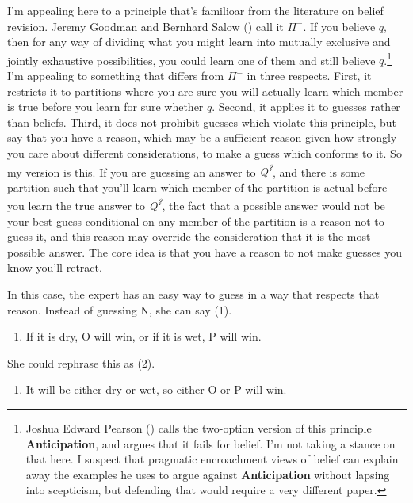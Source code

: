 \documentclass[
  11pt,
  letterpaper,
  DIV=11,
  numbers=noendperiod,
  twoside]{scrartcl}
\providecommand{\tightlist}{%
  \setlength{\itemsep}{0pt}\setlength{\parskip}{0pt}}
\begin{document}
I'm appealing here to a principle that's familioar from the literature
on belief revision. Jeremy Goodman and Bernhard Salow
() call it \(\Pi^-\). If you
believe \(q\), then for any way of dividing what you might learn into
mutually exclusive and jointly exhaustive possibilities, you could learn
one of them and still believe \(q\).\footnote{Joshua Edward Pearson
  () calls the two-option version of
  this principle \textbf{Anticipation}, and argues that it fails for
  belief. I'm not taking a stance on that here. I suspect that pragmatic
  encroachment views of belief can explain away the examples he uses to
  argue against \textbf{Anticipation} without lapsing into scepticism,
  but defending that would require a very different paper.} I'm
appealing to something that differs from \(\Pi^-\) in three respects.
First, it restricts it to partitions where you are sure you will
actually learn which member is true before you learn for sure whether
\(q\). Second, it applies it to guesses rather than beliefs. Third, it
does not prohibit guesses which violate this principle, but say that you
have a reason, which may be a sufficient reason given how strongly you
care about different considerations, to make a guess which conforms to
it. So my version is this. If you are guessing an answer to
\emph{Q\textsuperscript{?}}, and there is some partition such that
you'll learn which member of the partition is actual before you learn
the true answer to \emph{Q\textsuperscript{?}}, the fact that a possible
answer would not be your best guess conditional on any member of the
partition is a reason not to guess it, and this reason may override the
consideration that it is the most possible answer. The core idea is that
you have a reason to not make guesses you know you'll retract.

In this case, the expert has an easy way to guess in a way that respects
that reason. Instead of guessing N, she can say (1).

\begin{enumerate}
\def\labelenumi{(\arabic{enumi})}
\tightlist
\item
  If it is dry, O will win, or if it is wet, P will win.
\end{enumerate}

She could rephrase this as (2).

\begin{enumerate}
\def\labelenumi{(\arabic{enumi})}
\setcounter{enumi}{1}
\tightlist
\item
  It will be either dry or wet, so either O or P will win.
\end{enumerate}
\end{document}
